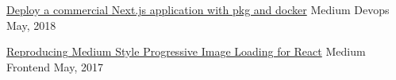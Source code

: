 
\begin{cvhonors}

  \cvhonor
    {\href{https://medium.com/@evenchange4/deploy-a-commercial-next-js-application-with-pkg-and-docker-5c73d4af2ee}{Deploy a commercial Next.js application with pkg and docker}} %
    {Medium} %
    {Devops} %
    {May, 2018} %

  \cvhonor
    {\href{https://medium.com/@evenchange4/reproducing-medium-style-progressive-image-loading-for-react-2e83bba0c608}{Reproducing Medium Style Progressive Image Loading for React}} %
    {Medium} %
    {Frontend} %
    {May, 2017} %

\end{cvhonors}


